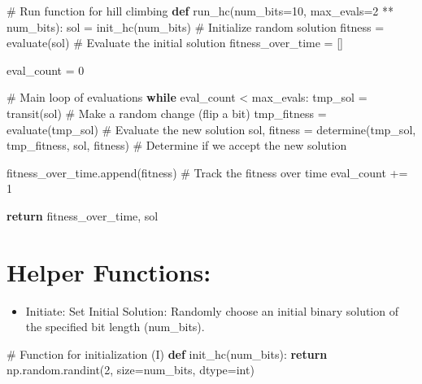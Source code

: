 \documentclass[
  letterpaper,
  DIV=11,
  numbers=noendperiod]{scrreprt}
\newenvironment{Shaded}{\begin{snugshade}}{\end{snugshade}}
\newcommand{\BuiltInTok}[1]{\textcolor[rgb]{0.00,0.23,0.31}{#1}}
\newcommand{\CommentTok}[1]{\textcolor[rgb]{0.37,0.37,0.37}{#1}}
\newcommand{\ControlFlowTok}[1]{\textcolor[rgb]{0.00,0.23,0.31}{\textbf{#1}}}
\newcommand{\DecValTok}[1]{\textcolor[rgb]{0.68,0.00,0.00}{#1}}
\newcommand{\KeywordTok}[1]{\textcolor[rgb]{0.00,0.23,0.31}{\textbf{#1}}}
\newcommand{\NormalTok}[1]{\textcolor[rgb]{0.00,0.23,0.31}{#1}}
\newcommand{\OperatorTok}[1]{\textcolor[rgb]{0.37,0.37,0.37}{#1}}
\providecommand{\tightlist}{%
  \setlength{\itemsep}{0pt}\setlength{\parskip}{0pt}}\usepackage{longtable,booktabs,array}
\begin{document}
\begin{Shaded}
\begin{Highlighting}[]
\CommentTok{\# Run function for hill climbing}
\KeywordTok{def}\NormalTok{ run\_hc(num\_bits}\OperatorTok{=}\DecValTok{10}\NormalTok{, max\_evals}\OperatorTok{=}\DecValTok{2} \OperatorTok{**}\NormalTok{ num\_bits):}
\NormalTok{    sol }\OperatorTok{=}\NormalTok{ init\_hc(num\_bits)  }\CommentTok{\# Initialize random solution}
\NormalTok{    fitness }\OperatorTok{=}\NormalTok{ evaluate(sol)  }\CommentTok{\# Evaluate the initial solution}
\NormalTok{    fitness\_over\_time }\OperatorTok{=}\NormalTok{ []}
    
\NormalTok{    eval\_count }\OperatorTok{=} \DecValTok{0}

    \CommentTok{\# Main loop of evaluations}
    \ControlFlowTok{while}\NormalTok{ eval\_count }\OperatorTok{\textless{}}\NormalTok{ max\_evals:}
\NormalTok{        tmp\_sol }\OperatorTok{=}\NormalTok{ transit(sol)  }\CommentTok{\# Make a random change (flip a bit)}
\NormalTok{        tmp\_fitness }\OperatorTok{=}\NormalTok{ evaluate(tmp\_sol)  }\CommentTok{\# Evaluate the new solution}
\NormalTok{        sol, fitness }\OperatorTok{=}\NormalTok{ determine(tmp\_sol, tmp\_fitness, sol, fitness)  }\CommentTok{\# Determine if we accept the new solution}
        
\NormalTok{        fitness\_over\_time.append(fitness)  }\CommentTok{\# Track the fitness over time}
\NormalTok{        eval\_count }\OperatorTok{+=} \DecValTok{1}
        
    \ControlFlowTok{return}\NormalTok{ fitness\_over\_time, sol}
\end{Highlighting}
\end{Shaded}

\section{Helper Functions:}\label{helper-functions-1}

\begin{itemize}
\tightlist
\item
  Initiate: Set Initial Solution: Randomly choose an initial binary
  solution of the specified bit length (num\_bits).
\end{itemize}

\begin{Shaded}
\begin{Highlighting}[]
\CommentTok{\# Function for initialization (I)}
\KeywordTok{def}\NormalTok{ init\_hc(num\_bits):}
    \ControlFlowTok{return}\NormalTok{ np.random.randint(}\DecValTok{2}\NormalTok{, size}\OperatorTok{=}\NormalTok{num\_bits, dtype}\OperatorTok{=}\BuiltInTok{int}\NormalTok{)}
\end{Highlighting}
\end{Shaded}
\end{document}
